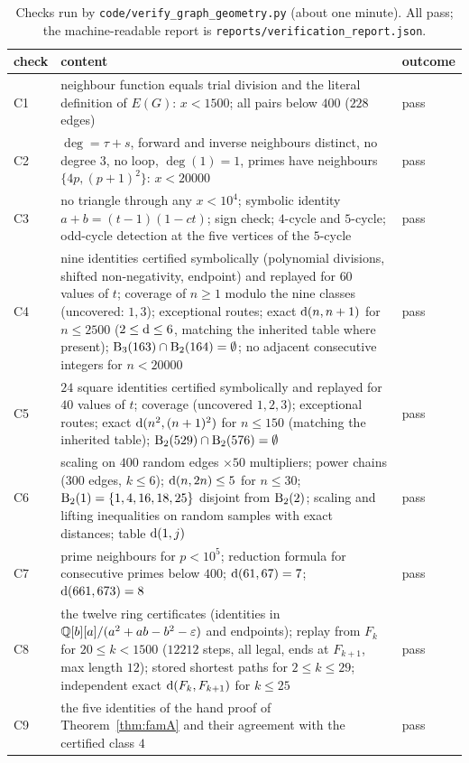 \begin{table}[ht]\centering\footnotesize
\begin{tabular}{@{}p{}p{}p{}@{}}\toprule
check & content & outcome\\\midrule
C1 & neighbour function equals trial division and the literal definition of $E(G)$: $x<1500$; all pairs below $400$ ($228$ edges) & pass\\
C2 & $\deg=\tau+s$, forward and inverse neighbours distinct, no degree $3$, no loop, $\deg(1)=1$, primes have neighbours $\{4p,(p+1)^2\}$: $x<20000$ & pass\\
C3 & no triangle through any $x<10^4$; symbolic identity $a+b=(t-1)(1-ct)$; sign check; $4$-cycle and $5$-cycle; odd-cycle detection at the five vertices of the $5$-cycle & pass\\
C4 & nine identities certified symbolically (polynomial divisions, shifted non-negativity, endpoint) and replayed for $60$ values of $t$; coverage of $n\ge1$ modulo the nine classes (uncovered: $1,3$); exceptional routes; exact $\operatorname{d}(n,n+1)$ for $n\le2500$ ($2\le\operatorname{d}\le6$, matching the inherited table where present); $\operatorname{B}_3(163)\cap\operatorname{B}_2(164)=\emptyset$; no adjacent consecutive integers for $n<20000$ & pass\\
C5 & $24$ square identities certified symbolically and replayed for $40$ values of $t$; coverage (uncovered $1,2,3$); exceptional routes; exact $\operatorname{d}(n^2,(n+1)^2)$ for $n\le150$ (matching the inherited table); $\operatorname{B}_2(529)\cap\operatorname{B}_2(576)=\emptyset$ & pass\\
C6 & scaling on $400$ random edges $\times50$ multipliers; power chains ($300$ edges, $k\le6$); $\operatorname{d}(n,2n)\le5$ for $n\le30$; $\operatorname{B}_2(1)=\{1,4,16,18,25\}$ disjoint from $\operatorname{B}_2(2)$; scaling and lifting inequalities on random samples with exact distances; table $\operatorname{d}(1,j)$ & pass\\
C7 & prime neighbours for $p<10^5$; reduction formula for consecutive primes below $400$; $\operatorname{d}(61,67)=7$; $\operatorname{d}(661,673)=8$ & pass\\
C8 & the twelve ring certificates (identities in $\mathbb{Q}[b][a]/(a^2+ab-b^2-\varepsilon)$ and endpoints); replay from $F_k$ for $20\le k<1500$ ($12212$ steps, all legal, ends at $F_{k+1}$, max length $12$); stored shortest paths for $2\le k\le29$; independent exact $\operatorname{d}(F_k,F_{k+1})$ for $k\le25$ & pass\\
C9 & the five identities of the hand proof of Theorem~\ref{thm:famA} and their agreement with the certified class $4$ & pass\\\bottomrule
\end{tabular}
\caption{Checks run by \texttt{code/verify\_graph\_geometry.py} (about one minute). All pass; the machine-readable report is \texttt{reports/verification\_report.json}.}\label{tab:checks}\end{table}

